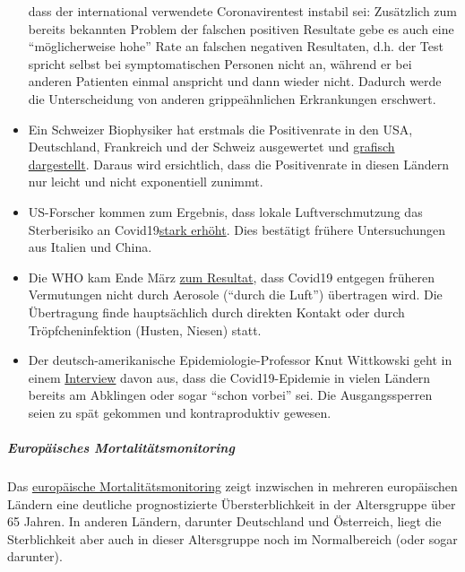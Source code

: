 \begin{itemize}
  dass der international verwendete Coronavirentest instabil sei:
  Zusätzlich zum bereits bekannten Problem der falschen positiven
  Resultate gebe es auch eine ``möglicherweise hohe'' Rate an falschen
  negativen Resultaten, d.h. der Test spricht selbst bei symptomatischen
  Personen nicht an, während er bei anderen Patienten einmal anspricht
  und dann wieder nicht. Dadurch werde die Unterscheidung von anderen
  grippeähnlichen Erkrankungen erschwert.
\item
  Ein Schweizer Biophysiker hat erstmals die Positivenrate in den USA,
  Deutschland, Frankreich und der Schweiz ausgewertet und
  \href{https://swprs.org/rate-of-positive-covid19-tests/}{grafisch
  dargestellt}. Daraus wird ersichtlich, dass die Positivenrate in
  diesen Ländern nur leicht und nicht exponentiell zunimmt.
\item
  US-Forscher kommen zum Ergebnis, dass lokale Luftverschmutzung das
  Sterberisiko an
  Covid19\href{https://www.heise.de/tp/features/Luftverschmutzung-erhoeht-Covid-19-Sterberisiko-4699306.html}{stark
  erhöht}. Dies bestätigt frühere Untersuchungen aus Italien und China.
\item
  Die WHO kam Ende März
  \href{https://www.who.int/news-room/commentaries/detail/modes-of-transmission-of-virus-causing-covid-19-implications-for-ipc-precaution-recommendations}{zum
  Resultat}, dass Covid19 entgegen früheren Vermutungen nicht durch
  Aerosole (``durch die Luft'') übertragen wird. Die Übertragung finde
  haupt­sächlich durch direkten Kontakt oder durch Tröpfcheninfektion
  (Husten, Niesen) statt.
\item
  Der deutsch-amerikanische Epidemiologie-Professor Knut Wittkowski geht
  in einem \href{https://www.youtube.com/watch?v=ARTf4bpiXuI}{Interview}
  davon aus, dass die Covid19-Epidemie in vielen Ländern bereits am
  Abklingen oder sogar ``schon vorbei'' sei. Die Ausgangssperren seien
  zu spät gekommen und kontraproduktiv gewesen.
\end{itemize}

\hypertarget{europuxe4isches-mortalituxe4tsmonitoring}{%
\subparagraph{\texorpdfstring{\textbf{Europäisches
Mortalitätsmonitoring}}{Europäisches Mortalitätsmonitoring}}\label{europuxe4isches-mortalituxe4tsmonitoring}}

Das
\href{https://www.euromomo.eu/outputs/zscore_country_total.html}{europäische
Mortalitätsmonitoring} zeigt inzwischen in mehreren europäischen Ländern
eine deutliche prognostizierte Übersterblichkeit in der Altersgruppe
über 65 Jahren. In anderen Ländern, darunter Deutschland und Österreich,
liegt die Sterblichkeit aber auch in dieser Altersgruppe noch im
Normalbereich (oder sogar darunter).

